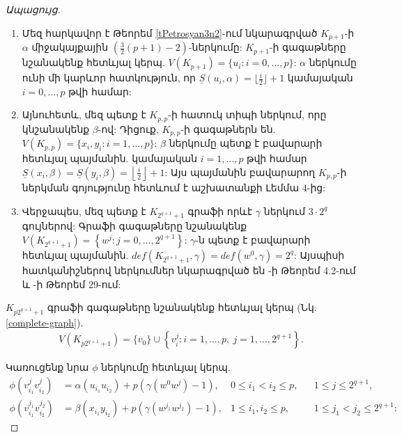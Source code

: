 \begin{proof}[Ապացույց]
\begin{enumerate}
    \item Մեզ հարկավոր է Թեորեմ \ref{tPetrosyan3n2}-ում նկարագրված $K_{p+1}$-ի $\alpha$ միջակայքային $\left(\frac{3}{2}(p+1)-2 \right)$-ներկումը: $K_{p+1}$-ի գագաթները նշանակենք հետևյալ կերպ. $V(K_{p+1}) = \{u_i : i=0, \ldots, p\}$: $\alpha$ ներկումը ունի մի կարևոր հատկություն, որ $\underline{S}(u_i, \alpha) = \lfloor \frac{i}{2} \rfloor + 1$ կամայական $i = 0,\ldots,p$ թվի համար:
    \item Այնուհետև, մեզ պետք է $K_{p,p}$-ի հատուկ տիպի ներկում, որը կնշանակենք $\beta$-ով: Դիցուք, $K_{p,p}$-ի գագաթներն են. $V(K_{p,p}) = \{x_i,y_i:i=1,\ldots,p\}$: $\beta$ ներկումը պետք է բավարարի հետևյալ պայմանին. կամայական $i=1,\ldots,p$ թվի համար $\underline{S}(x_i,\beta) = \underline{S}(y_i,\beta) = \left\lfloor \frac{i}{2} \right\rfloor + 1$: Այս պայմանին բավարարող $K_{p,p}$-ի ներկման գոյությունը հետևում է \cite{TepanyanPetrosyan} աշխատանքի Լեմմա 4-ից:
    \item Վերջապես, մեզ պետք է $K_{2^{q+1}+1}$ գրաֆի որևէ $\gamma$ ներկում $3\cdot2^q$ գույներով: Գրաֆի գագաթները նշանակենք $V(K_{2^{q+1}+1}) = \left\{w^j : j=0,\ldots, 2^{q+1} \right\}$: $\gamma$-ն պետք է բավարարի հետևյալ պայմանին. $def(K_{2^{q+1}+1},\gamma) = def(w^0, \gamma) = 2^q$: Այսպիսի հատկանիշներով ներկումներ նկարագրված են \cite{GiaroKubaleMalafiejski2001}-ի Թեորեմ 4.2-ում և \cite{PetrosyanMkhitaryan}-ի Թեորեմ 29-ում:
\end{enumerate}


$K_{p2^{q+1}+1}$ գրաֆի գագաթները նշանակենք հետևյալ կերպ (Նկ. \ref{complete-graph}). 
\begin{align*}
V\left(K_{p2^{q+1}+1}\right) = \{v_0\} \cup \left\{v_i^j : i=1,\ldots,p,\ j=1,\ldots,2^{q+1} \right\}.
\end{align*}

Կառուցենք նրա $\phi$ ներկումը հետևյալ կերպ.
\begin{align*}
\phi\left(v_{i_1}^j v_{i_2}^j\right) &= \alpha(u_{i_1}u_{i_2}) + p\left(\gamma(w^0w^j) - 1\right), & 0 \leq i_1 < i_2 \leq p, & & 1 \leq j \leq 2^{q+1}, \\
\phi\left(v_{i_1}^{j_1}v_{i_2}^{j_2}\right) &= \beta(x_{i_1}y_{i_2}) + p\left(\gamma(w^{j_1}w^{j_2}) - 1\right), & 1 \leq i_1, i_2 \leq p, & & 1 \leq j_1 < j_2 \leq 2^{q+1}: 
\end{align*} %


\end{proof}
